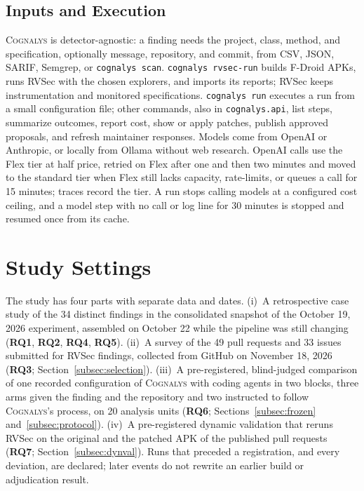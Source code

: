 \documentclass[conference]{IEEEtran}
\newcommand{\system}{\textsc{Cognalys}}
\newcommand{\researchq}[1]{\textbf{RQ#1}}
\begin{document}
\subsection{Inputs and Execution}

\system{} is detector-agnostic: a finding needs the project, class, method, and
specification, optionally message, repository, and commit, from CSV, JSON,
SARIF, Semgrep, or \texttt{cognalys scan}. \texttt{cognalys rvsec-run} builds
F-Droid APKs, runs RVSec with the chosen explorers, and imports its reports;
RVSec keeps instrumentation and monitored specifications. \texttt{cognalys run}
executes a run from a small configuration file; other commands, also in
\texttt{cognalys.api}, list steps, summarize outcomes, report cost, show or
apply patches, publish approved proposals, and refresh maintainer responses.
Models come from OpenAI or Anthropic, or locally from Ollama without web
research. OpenAI calls use the Flex tier at half price, retried on Flex after
one and then two minutes and moved to the standard tier when Flex still lacks
capacity, rate-limits, or queues a call for 15 minutes; traces record the tier.
A run stops calling models at a configured cost ceiling, and a model step with
no call or log line for 30 minutes is stopped and resumed once from its cache.

\section{Study Settings}
\label{sec:settings}

The study has four parts with separate data and dates. (i)~A retrospective
case study of the 34 distinct findings in the consolidated snapshot of the
October 19, 2026 experiment, assembled on October 22 while the pipeline was
still changing (\researchq{1}, \researchq{2}, \researchq{4}, \researchq{5}).
(ii)~A survey of the 49 pull requests and 33 issues submitted for RVSec
findings, collected from GitHub on November 18, 2026 (\researchq{3};
Section~\ref{subsec:selection}). (iii)~A pre-registered, blind-judged
comparison of one recorded configuration of {\system} with coding agents in two
blocks, three arms given the finding and the repository and two instructed
to follow {\system}'s process, on 20 analysis units
(\researchq{6}; Sections~\ref{subsec:frozen} and~\ref{subsec:protocol}).
(iv)~A pre-registered dynamic validation that reruns RVSec on the original and
the patched APK of the published pull requests (\researchq{7};
Section~\ref{subsec:dynval}). Runs that preceded a registration, and every
deviation, are declared; later events do not rewrite an earlier build or
adjudication result.
\end{document}
